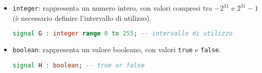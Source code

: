 \begin{itemize}
            \item \texttt{integer}: rappresenta un numero intero, con valori compresi tra $-2^{31}$ e $2^{31}-1$ (è necessario definire l'intervallo di utilizzo).
            \begin{lstlisting}[language=VHDL]
                signal G : integer range 0 to 255; -- intervallo di utilizzo
            \end{lstlisting}
            \item \texttt{boolean}: rappresenta un valore booleano, con valori \texttt{true} e \texttt{false}.
            \begin{lstlisting}[language=VHDL]
                signal H : boolean; -- true or false
            \end{lstlisting}
        \end{itemize}
